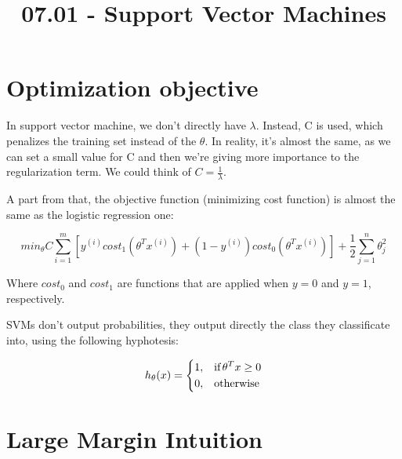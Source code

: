 \documentclass[10pt]{extarticle}
\begin{document}
 



\title{07.01 - Support Vector Machines}

    
    \date{}
    

    

    \maketitle

\newpage





\section{Optimization objective}\label{optimization-objective}

In support vector machine, we don't directly have $\lambda$. Instead, C
is used, which penalizes the training set instead of the $\theta$. In
reality, it's almost the same, as we can set a small value for C and
then we're giving more importance to the regularization term. We could
think of $C = \frac{1}{\lambda}$.

A part from that, the objective function (minimizing cost function) is
almost the same as the logistic regression one:

\begin{equation} 
min_{\theta} C \sum_{i=1}^m [y^{(i)}cost_1(\theta^T x^{(i)}) + (1 - y^{(i)})cost_0(\theta^T x^{(i)})] + \frac{1}{2} \sum_{j=1}^n \theta_j^2
\end{equation}

Where $cost_0$ and $cost_1$ are functions that are applied when $y = 0$
and $y = 1$, respectively. \smallskip

SVMs don't output probabilities, they output directly the class they
classificate into, using the following hyphotesis:

\begin{equation} 
h_\theta(x) = 
\begin{dcases}
    1, & \text{if\,} \theta^Tx \geq 0 \\ 
    0, & \text{otherwise}
\end{dcases} 
\end{equation}

\section{Large Margin Intuition}\label{large-margin-intuition}
\end{document}
